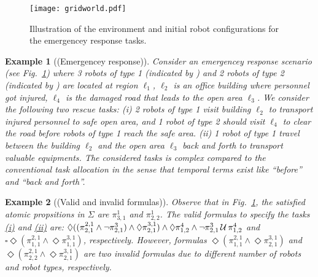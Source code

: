 \documentclass[Afour,sageh,times]{sagej}
\newtheorem{exmp}{Example}
\renewcommand{\ap}[3]{\mathcal{\pi}_{{#1},{#2}}^{#3}}
\newenvironment{cexmp}
{\addtocounter{exmp}{-1}\begin{exmp}}
  {\end{exmp}}
\newlength\myheight
\newlength\mydepth
\newcommand*\inlinegraphics[1]{%
  \settototalheight\myheight{Xygp}%
  \settodepth\mydepth{Xygp}%
  \raisebox{-0.7\mydepth}{\texttt{[image: \#1]}}%
}
\begin{document}
 \begin{figure}[!t]
    \centering
    \texttt{[image: gridworld.pdf]}
    \caption{Illustration of the environment and initial robot configurations for the emergencey response tasks.}\label{fig:workspace}
\end{figure}
\begin{exmp}[(Emergencey response)]\label{exmp:1}
  Consider an emergencey response scenario (see Fig.~\ref{fig:workspace}) where 3 robots of type 1 (indicated by \inlinegraphics{star.pdf}) and 2 robots of type 2 (indicated by \inlinegraphics{bluedot.pdf}) are located at region $\ell_1$, $\ell_2$ is an office building where personnel got injured, $\ell_4$ is the damaged road that leads to the open area $\ell_3$. We consider the following two rescue tasks: {\it (i)} \label{task:i} 2 robots of type 1 visit building $\ell_2$ to transport injured personnel to safe open area, and 1 robot of type 2 should visit $\ell_4$ to clear the road before robots of type 1 reach the safe area. {\it (ii)} \label{task:ii} 1 robot of type 1 travel between the building $\ell_2$ and the open area $\ell_3$ back and forth to transport valuable equipments. The considered tasks is complex compared to the conventional task allocation  in the sense that temporal terms exist like ``before'' and ``back and forth''.
\end{exmp}


 \begin{cexmp} [(Valid and invalid formulas)]
Observe that in Fig.~\ref{fig:workspace}, the satisfied atomic propsitions in $\Sigma$ are $\ap{3}{1}{1}$ and $\ap{2}{2}{1}$.   The valid formulas to specify the tasks \hyperref[task:i]{\it (i)} and \hyperref[task:ii]{\it (ii)} are: $\Diamond \Large((\ap{2}{1}{2,1}\wedge \neg \ap{2}{1}{3}) \wedge  \Diamond \ap{2}{1}{3,1}\Large)  \wedge \Diamond \ap{1}{2}{4} \wedge \neg \ap{2}{1}{3} \,\mathcal{U}\, \ap{1}{2}{4}$ and $\square \Diamond (\ap{1}{1}{2,1} \wedge \Diamond \ap{1}{1}{3,1})$, respectively. However, formulas $\Diamond (\ap{1}{1}{2,1} \wedge \Diamond \ap{2}{1}{3,1})$ and $\Diamond (\ap{2}{2}{2,1} \wedge \Diamond \ap{2}{1}{3,1})$ are two invalid formulas due to different number of robots and robot types, respectively.
 \end{cexmp}
\end{document}
